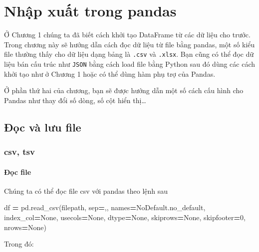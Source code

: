 \documentclass[
]{book}
\newenvironment{Shaded}{\begin{snugshade}}{\end{snugshade}}
\newcommand{\DecValTok}[1]{\textcolor[rgb]{0.00,0.00,0.81}{#1}}
\newcommand{\NormalTok}[1]{#1}
\newcommand{\OperatorTok}[1]{\textcolor[rgb]{0.81,0.36,0.00}{\textbf{#1}}}
\newcommand{\StringTok}[1]{\textcolor[rgb]{0.31,0.60,0.02}{#1}}
\newcommand{\VariableTok}[1]{\textcolor[rgb]{0.00,0.00,0.00}{#1}}
\begin{document}
\chapter{Nhập xuất trong pandas}\label{nhux1eadp-xuux1ea5t-trong-pandas}

Ở Chương 1 chúng ta đã biết cách khởi tạo DataFrame từ các dữ liệu cho trước.
Trong chương này sẽ hướng dẫn cách đọc dữ liệu từ file bằng pandas, một số kiểu file thường thấy cho dữ liệu dạng bảng là \texttt{.csv} và \texttt{.xlsx}.
Bạn cũng có thể đọc dữ liệu bán cấu trúc như \texttt{JSON} bằng cách load file bằng Python sau đó dùng các cách khởi tạo như ở Chương 1 hoặc có thể dùng
hàm phụ trợ của Pandas.

Ở phần thứ hai của chương, bạn sẽ được hướng dẫn một số cách cấu hình cho Pandas như thay đổi số dòng, số cột hiển thị\ldots{}

\section{Đọc và lưu file}\label{ux111ux1ecdc-vuxe0-lux1b0u-file}

\subsection{csv, tsv}\label{csv-tsv}

\subsubsection{Đọc file}\label{ux111ux1ecdc-file}

Chúng ta có thể đọc file csv với pandas theo lệnh sau

\begin{Shaded}
\begin{Highlighting}[]
\NormalTok{df }\OperatorTok{=}\NormalTok{ pd.read\_csv(filepath, sep}\OperatorTok{=}\StringTok{\textquotesingle{},\textquotesingle{}}\NormalTok{, names}\OperatorTok{=}\NormalTok{NoDefault.no\_default, index\_col}\OperatorTok{=}\VariableTok{None}\NormalTok{, usecols}\OperatorTok{=}\VariableTok{None}\NormalTok{, dtype}\OperatorTok{=}\VariableTok{None}\NormalTok{, skiprows}\OperatorTok{=}\VariableTok{None}\NormalTok{, skipfooter}\OperatorTok{=}\DecValTok{0}\NormalTok{, nrows}\OperatorTok{=}\VariableTok{None}\NormalTok{)}
\end{Highlighting}
\end{Shaded}

Trong đó:
\end{document}
